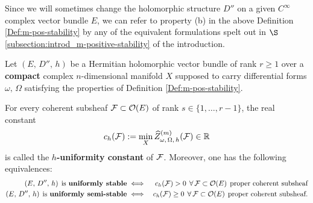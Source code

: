 \documentclass[12pt]{article}
\begin{document}
\vspace{2ex}

Since we will sometimes change the holomorphic structure $D''$ on a given $C^\infty$ complex vector bundle $E$, we can refer to property (b) in the above Definition \ref{Def:m-pos-stability} by any of the equivalent formulations spelt out in $\S$\ref{subsection:introd_m-positive-stability} of the introduction.




\begin{Cor-Def}\label{Cor-Def:Z_unif-lower-bounf_F} Let $(E,\,D'',\,h)$ be a Hermitian holomorphic vector bundle of rank $r\geq 1$ over a {\bf compact} complex $n$-dimensional manifold $X$ supposed to carry differential forms $\omega,\,\Omega$ satisfying the properties of Definition \ref{Def:m-pos-stability}.

  For every coherent subsheaf ${\cal F}\subset{\cal O}(E)$ of rank $s\in\{1,\dots , r-1\}$, the real constant \begin{eqnarray}\label{eqn:h-unif-constant}c_h({\cal F}):=\min\limits_X \widehat{Z}_{\omega,\,\Omega,\,h}^{(m)}({\cal F})\in\mathbb{R} \end{eqnarray} is called the {\bf $h$-uniformity constant} of  ${\cal F}$. Moreover, one has the following equivalences: \begin{eqnarray*}\label{eqn:Z_unif-lower-bounf_F}(E,\,D'',\,h) \hspace{1ex} \mbox{is {\bf uniformly stable}} & \iff & c_h({\cal F})>0  \hspace{1ex} \forall\,{\cal F}\subset{\cal O}(E)\hspace{1ex} \mbox{proper coherent subsheaf}\\
    (E,\,D'',\,h) \hspace{1ex} \mbox{is {\bf uniformly semi-stable}} & \iff & c_h({\cal F})\geq 0  \hspace{1ex} \forall\,{\cal F}\subset{\cal O}(E)\hspace{1ex} \mbox{proper coherent subsheaf}.\end{eqnarray*}

    


\end{Cor-Def}  
\end{document}
